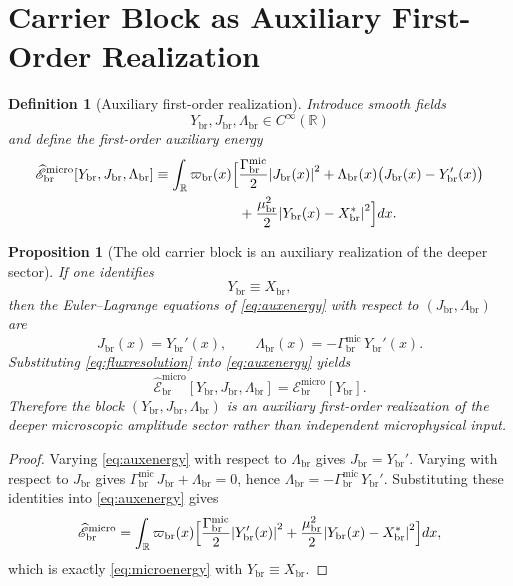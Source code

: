 \documentclass[11pt]{article}
\newcommand{\ProfWeight}{\varpi_{\mathrm{br}}}
\newcommand{\RespCarrier}{Y_{\mathrm{br}}}
\newcommand{\RespFlux}{J_{\mathrm{br}}}
\newcommand{\RespCompat}{\Lambda_{\mathrm{br}}}
\newcommand{\RespMicro}{X_{\mathrm{br}}}
\newcommand{\RespMicroEq}{X_{\mathrm{br}}^{\ast}}
\newcommand{\RespMicroFluxCoeff}{\Gamma_{\mathrm{br}}^{\mathrm{mic}}}
\newcommand{\RespMicroGap}{\mu_{\mathrm{br}}}
\newcommand{\RespMicroEnergy}{\mathscr E_{\mathrm{br}}^{\mathrm{micro}}}
\newcommand{\RespMicroAuxEnergy}{\widehat{\mathscr E}_{\mathrm{br}}^{\mathrm{micro}}}
\newtheorem{definition}{Definition}
\newtheorem{proposition}{Proposition}
\begin{document}
\section{Carrier Block as Auxiliary First-Order Realization}

\begin{definition}[Auxiliary first-order realization]
\label{def:auxiliary}
Introduce smooth fields
\begin{equation}
\RespCarrier,\RespFlux,\RespCompat\in C^\infty(\mathbb R)
\label{eq:carrierfields}
\end{equation}
and define the first-order auxiliary energy
\begin{align}
\RespMicroAuxEnergy[\RespCarrier,\RespFlux,\RespCompat]
\equiv
\int_{\mathbb R}\ProfWeight(x)\Bigl[
&\frac{\RespMicroFluxCoeff}{2}\abs{\RespFlux(x)}^2
+\RespCompat(x)\bigl(\RespFlux(x)-\RespCarrier'(x)\bigr)
\nonumber\\
&+\frac{\RespMicroGap^2}{2}\abs{\RespCarrier(x)-\RespMicroEq}^2
\Bigr]dx.
\label{eq:auxenergy}
\end{align}
\end{definition}

\begin{proposition}[The old carrier block is an auxiliary realization of the deeper sector]
\label{prop:auxiliary}
If one identifies
\begin{equation}
\RespCarrier\equiv\RespMicro,
\label{eq:identifyY}
\end{equation}
then the Euler--Lagrange equations of \eqref{eq:auxenergy} with respect to \((\RespFlux,\RespCompat)\) are
\begin{equation}
\RespFlux(x)=\RespCarrier'(x),
\qquad
\RespCompat(x)=-\RespMicroFluxCoeff\,\RespCarrier'(x).
\label{eq:fluxresolution}
\end{equation}
Substituting \eqref{eq:fluxresolution} into \eqref{eq:auxenergy} yields
\begin{equation}
\RespMicroAuxEnergy[\RespCarrier,\RespFlux,\RespCompat]
=
\RespMicroEnergy[\RespCarrier].
\label{eq:auxequalsmicro}
\end{equation}
Therefore the block \((\RespCarrier,\RespFlux,\RespCompat)\) is an auxiliary first-order realization of the deeper microscopic amplitude sector rather than independent microphysical input.
\end{proposition}

\begin{proof}
Varying \eqref{eq:auxenergy} with respect to \(\RespCompat\) gives \(\RespFlux=\RespCarrier'\). Varying with respect to \(\RespFlux\) gives \(\RespMicroFluxCoeff\,\RespFlux+\RespCompat=0\), hence \(\RespCompat=-\RespMicroFluxCoeff\,\RespCarrier'\). Substituting these identities into \eqref{eq:auxenergy} gives
\[
\RespMicroAuxEnergy
=
\int_{\mathbb R}\ProfWeight(x)\Bigl[
\frac{\RespMicroFluxCoeff}{2}\abs{\RespCarrier'(x)}^2
+
\frac{\RespMicroGap^2}{2}\abs{\RespCarrier(x)-\RespMicroEq}^2
\Bigr]dx,
\]
which is exactly \eqref{eq:microenergy} with \(\RespCarrier\equiv\RespMicro\).
\end{proof}
\end{document}
